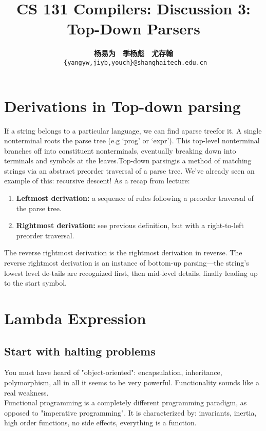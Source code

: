 \documentclass[a4paper]{article}
\title{CS 131 Compilers: Discussion 3: Top-Down Parsers}
\author{\textbf{杨易为}~~\textbf{季杨彪}~~\textbf{尤存翰} \\ \texttt{ \{yangyw,jiyb,youch\}@shanghaitech.edu.cn}}
\theoremstyle{definition}
\begin{document}
\maketitle

\section{Derivations in Top-down parsing}

If a string belongs to a particular language, we can find aparse treefor it.  A single nonterminal  roots  the  parse  tree  (e.g  ‘prog’  or  ‘expr’).   This  top-level  nonterminal branches off into constituent nonterminals, eventually breaking down into terminals and symbols at the leaves.Top-down parsingis a method of matching strings via an abstract preorder traversal of a parse tree.  We’ve already seen an example of this: recursive descent!  As a recap from lecture:
\begin {enumerate}
\item \textbf{Leftmost derivation:}  a  sequence  of  rules  following  a  preorder  traversal  of  the parse tree.
\item \textbf{Rightmost derivation:} see previous definition, but with a right-to-left preorder traversal.
\end{enumerate}

The reverse rightmost derivation is the rightmost derivation in reverse.  The reverse rightmost derivation is an instance of bottom-up parsing—the string’s lowest level de-tails are recognized first, then mid-level details, finally leading up to the start symbol.

\section{Lambda Expression}

\subsection{Start with halting problems}

You must have heard of "object-oriented": encapsulation, inheritance, polymorphism, all in all it seems to be very powerful. Functionality sounds like a real weakness.
\\
Functional programming is a completely different programming paradigm, as opposed to "imperative programming". It is characterized by: invariants, inertia, high order functions, no side effects, everything is a function.
\end{document}
